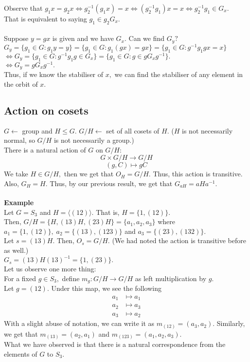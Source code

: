 \documentclass[12 pt, a4paper, toc=graduated, oneside]{article}
\theoremstyle{definition}
\begin{document}
Observe that $g_1x = g_2x \iff g_2^{-1}(g_1x) = x \iff (g_2^{-1}g_1)x = x \iff g_2^{-1}g_1 \in G_x.$\\
That is equivalent to saying $g_1 \in g_2G_x.$\\~\\
Suppose $y = gx$ is given and we have $G_x.$ Can we find $G_y?$\\
$G_y = \{g_1 \in G : g_1 y = y\} = \{g_1 \in G : g_1(gx) = gx\} = \{g_1 \in G : g^{-1}g_1gx = x\}$\\
$\iff G_y = \{g_1 \in G : g^{-1}g_1g \in G_x\} = \{g_1 \in G : g \in gG_xg^{-1}\}.$\\
$\iff G_y = gG_xg^{-1}.$\\
Thus, if we know the stabiliser of $x,$ we can find the stabiliser of any element in the orbit of $x.$

\subsection{Action on cosets}

$G \longleftarrow$ group and $H \le G.$ $G/H \longleftarrow $ set of all cosets of $H$. ($H$ is not necessarily normal, so $G/H$ is not necessarily a group.)\\
There is a natural action of $G$ on $G/H:$
\[G \times G/H \to G/H\]
\[(g, C) \mapsto gC\]
We take $H \in G/H,$ then we get that $O_H = G/H.$ Thus, this action is transitive.\\
Also, $G_H = H.$ Thus, by our previous result, we get that $G_{aH} = aHa^{-1}.$\\~\\
\textbf{Example}\\
Let $G = S_3$ and $H = \langle  (12)\rangle.$ That is, $H = \{1, (12)\}.$\\
Then, $G/H = \{H, (13)H, (23)H\} = \{a_1, a_2, a_3\}$ where $a_1 = \{1, (12)\}, \; a_2 = \{(13), (123)\}$ and $a_3 = \{(23), (132)\}.$\\
Let $s = (13)H.$ Then, $O_s = G/H.$ (We had noted the action is transitive before as well.)\\
$G_s = (13)H(13)^{-1} = \{1, (23)\}.$\\
Let us observe one more thing:\\
For a fixed $g \in S_3,$ define $m_g : G/H \to G/H$ as left multiplication by $g.$\\
Let $g = (12).$ Under this map, we see the following
\begin{align*}
	a_1 & \mapsto a_1\\
	a_2 & \mapsto a_3\\
	a_3 & \mapsto a_2
\end{align*}
With a slight abuse of notation, we can write it as $m_{(12)} = (a_3, a_2).$
Similarly, we get that $m_{(13)} = (a_2, a_1)$ and $m_{(123)} = (a_1, a_2, a_3).$\\
What we have observed is that there is a natural correspondence from the elements of $G$ to $S_3.$
\end{document}

